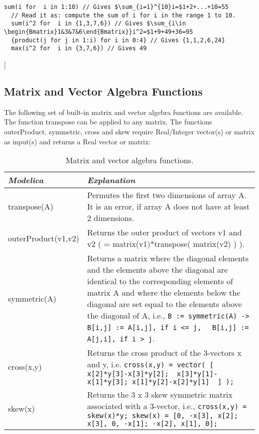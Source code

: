 \begin{lstlisting}[language=modelica, mathescape=true, frame=none]
  sum(i for  i in 1:10) // Gives $\sum_{i=1}^{10}i=$1+2+...+10=55
  // Read it as: compute the sum of i for i in the range 1 to 10.
  sum(i^2 for  i in {1,3,7,6}) // Gives $\sum_{i\in \begin{Bmatrix}1&3&7&6\end{Bmatrix}}i^2=$1+9+49+36=95
  {product(j for j in 1:i) for i in 0:4} // Gives {1,1,2,6,24}
  max(i^2 for  i in {3,7,6}) // Gives 49
\end{lstlisting}
{]}

\subsection{Matrix and Vector Algebra Functions}

The following set of built-in matrix and vector algebra functions are
available. The function transpose can be applied to any matrix. The
functions outerProduct, symmetric, cross and skew require Real/Integer
vector(s) or matrix as input(s) and returns a Real vector or matrix:

\begin{longtable}[]{|p{3.5cm}|p{11.5cm}|}
\caption{Matrix and vector algebra functions.}\\
\hline
\emph{Modelica} & \emph{Explanation}\\ \hline
\endhead
transpose(A)
& Permutes the first two dimensions of array A. It is an error, if array A
does not have at least 2 dimensions.\\ \hline
outerProduct(v1,v2)
& Returns the outer product of vectors v1 and v2 ( = matrix(v1)*transpose(
matrix(v2) ) ).\\ \hline
symmetric(A)
& Returns a matrix where the diagonal elements and the elements above the
diagonal are identical to the corresponding elements of matrix A and
where the elements below the diagonal are set equal to the elements
above the diagonal of A, i.e., \lstinline!B := symmetric(A) ->!
  \lstinline!B[i,j] := A[i,j], if i <= j, ! \lstinline! B[i,j] := A[j,i], if i > j!.\\ \hline
cross(x,y)
& Returns the cross product of the 3-vectors x and y, i.e.
\lstinline!cross(x,y) = vector( [ x[2]*y[3]-x[3]*y[2];  x[3]*y[1]-x[1]*y[3]; x[1]*y[2]-x[2]*y[1]  ] );!\\ \hline
skew(x)
& Returns the 3 x 3 skew symmetric matrix associated with a 3-vector,
  i.e., \lstinline!cross(x,y) = skew(x)*y; skew(x) = [0, -x[3], x[2]; x[3], 0, -x[1]; -x[2], x[1], 0];!\\ \hline
\end{longtable}

